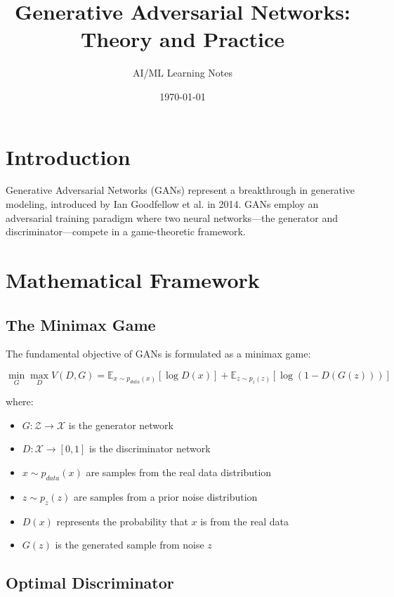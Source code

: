 \documentclass[12pt,a4paper]{article}
\title{Generative Adversarial Networks: Theory and Practice}
\author{AI/ML Learning Notes}
\date{\today}
\begin{document}
\maketitle
\tableofcontents
\newpage

\section{Introduction}

Generative Adversarial Networks (GANs) represent a breakthrough in generative modeling, introduced by Ian Goodfellow et al. in 2014. GANs employ an adversarial training paradigm where two neural networks—the generator and discriminator—compete in a game-theoretic framework.

\section{Mathematical Framework}

\subsection{The Minimax Game}

The fundamental objective of GANs is formulated as a minimax game:

\begin{equation}
\min_G \max_D V(D, G) = \mathbb{E}_{x \sim p_{data}(x)}[\log D(x)] + \mathbb{E}_{z \sim p_z(z)}[\log(1 - D(G(z)))]
\end{equation}

where:
\begin{itemize}
    \item $G: \mathcal{Z} \rightarrow \mathcal{X}$ is the generator network
    \item $D: \mathcal{X} \rightarrow [0, 1]$ is the discriminator network
    \item $x \sim p_{data}(x)$ are samples from the real data distribution
    \item $z \sim p_z(z)$ are samples from a prior noise distribution
    \item $D(x)$ represents the probability that $x$ is from the real data
    \item $G(z)$ is the generated sample from noise $z$
\end{itemize}

\subsection{Optimal Discriminator}
\end{document}
